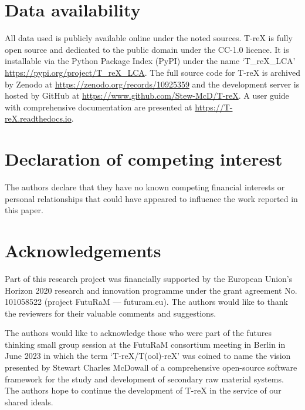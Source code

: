 \documentclass[a4paper,fleqn]{cas-dc}
\begin{document}
\section*{Data availability}
All data used is publicly available online under the noted sources. T-reX is fully open source and dedicated to the public domain under the CC-1.0 licence. It is installable via the Python Package Index (PyPI) under the name `T\_reX\_LCA' \url{https://pypi.org/project/T_reX_LCA}.
The full source code for T-reX is archived by Zenodo at \url{https://zenodo.org/records/10925359} 
and the development server is hosted by GitHub at \url{https://www.github.com/Stew-McD/T-reX}. A user guide with comprehensive documentation are presented at \url{https://T-reX.readthedocs.io}.

\section*{Declaration of competing interest}
The authors declare that they have no known competing financial interests or personal relationships that could have appeared to influence the work reported in this paper.

\section*{Acknowledgements}
Part of this research project was financially supported by the European Union's Horizon 2020 research and innovation programme under the grant agreement No. 101058522 (project FutuRaM --- futuram.eu). The authors would like to thank the reviewers for their valuable comments and suggestions.

The authors would like to acknowledge those who were part of the futures
thinking small group session at the FutuRaM consortium meeting in Berlin in
June 2023 in which the term `T-reX/T(ool)-reX' was coined to name the vision
presented by Stewart Charles McDowall of a comprehensive open-source software
framework for the study and development of secondary raw material systems. The
authors hope to continue the development of T-reX in the service of our shared
ideals.



\end{document}
